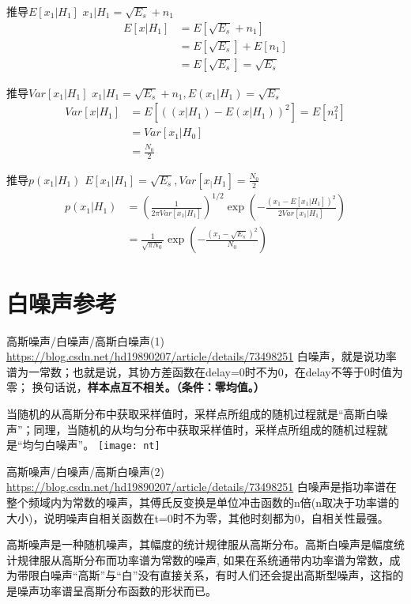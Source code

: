 \begin{frame}{推导$E[x_1|H_1]$}
$x_1|H_1=\sqrt{E_s}+n_1$
\begin{align*}
E[x|H_1]&=E\left[\sqrt{E_s}+n_1\right]\\
&=E[\sqrt{E_s}]+E[n_1]\\
&=E[\sqrt{E_s}]=\sqrt{E_s}
\end{align*}
\end{frame}

\begin{frame}{推导$Var[x_1|H_1]$}
$x_1|H_1=\sqrt{E_s}+n_1,E(x_1|H_1)=\sqrt{E_s}$
\begin{align*}
Var[x|H_1]&=E[((x|H_1)-E(x|H_1))^2]=E[n_1^2]\\
&=Var[x_1|H_0]\\
&=\frac{N_0}{2}
\end{align*}
\end{frame}

\begin{frame}{推导$p(x_1|H_1)$}
$E[x_1|H_1]=\sqrt{E_s},Var[x_|H_1]=\frac{N_0}{2}$
\begin{align*}
p(x_1|H_1)&=\left(\frac{1}{2\pi Var[x_1|H_1]}\right)^{1/2}\exp\left(-\frac{(x_1-E[x_1|H_1])^2}{2Var[x_1|H_1]}\right)\\
&=\frac{1}{\sqrt{\pi N_0}}\exp\left(-\frac{(x_1-\sqrt{E_s})^2}{N_0}\right)
\end{align*}
\end{frame}

\section{白噪声参考}

\begin{frame}{高斯噪声/白噪声/高斯白噪声(1)}
\url{https://blog.csdn.net/hd19890207/article/details/73498251}
 白噪声，就是说功率谱为一常数；也就是说，其协方差函数在delay=0时不为0，在delay不等于0时值为零； 换句话说，\textbf{样本点互不相关。（条件：零均值。）}
 
 当随机的从高斯分布中获取采样值时，采样点所组成的随机过程就是“高斯白噪声”；同理，当随机的从均匀分布中获取采样值时，采样点所组成的随机过程就是“均匀白噪声”。
\texttt{[image: nt]}
\end{frame}

\begin{frame}{高斯噪声/白噪声/高斯白噪声(2)}
\url{https://blog.csdn.net/hd19890207/article/details/73498251}
白噪声是指功率谱在整个频域内为常数的噪声，其傅氏反变换是单位冲击函数的n倍(n取决于功率谱的大小)，说明噪声自相关函数在t=0时不为零，其他时刻都为0，自相关性最强。

高斯噪声是一种随机噪声，其幅度的统计规律服从高斯分布。高斯白噪声是幅度统计规律服从高斯分布而功率谱为常数的噪声, 如果在系统通带内功率谱为常数，成为带限白噪声“高斯”与“白”没有直接关系，有时人们还会提出高斯型噪声，这指的是噪声功率谱呈高斯分布函数的形状而已。 
\end{frame}

